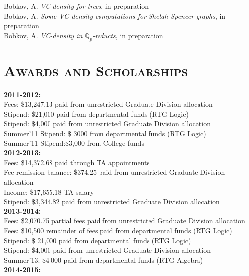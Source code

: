 \documentclass[margin, 10pt]{res} %
\begin{document}
\begin{resume}
Bobkov, A. {\it VC-density for trees}, in preparation  \\
Bobkov, A. {\it Some VC-density computations for Shelah-Spencer graphs}, in preparation \\
Bobkov, A. {\it VC-density in $\mathbb{Q}_p$-reducts}, in preparation

\section{\textsc{Awards and Scholarships}}

\textbf{2011-2012:} \\

Fees: \$13,247.13 paid from unrestricted Graduate Division allocation \\
Stipend: \$21,000 paid from departmental funds (RTG Logic) \\
Stipend: \$4,000 paid from unrestricted Graduate Division allocation \\
Summer'11 Stipend: \$ 3000 from departmental funds (RTG Logic) \\
Summer'11 Stipend:\$3,000 from College funds \\

\textbf{2012-2013:} \\

Fees: \$14,372.68 paid through TA appointments \\
Fee remission balance: \$374.25 paid from unrestricted Graduate Division allocation  \\
Income: \$17,655.18 TA salary \\
Stipend: \$3,344.82 paid from unrestricted Graduate Division allocation \\				
  
\textbf{2013-2014:} \\

Fees: \$2,070.75 partial fees paid from unrestricted Graduate Division allocation \\
Fees: \$10,500 remainder of fees paid from departmental funds (RTG Logic) \\
Stipend:  \$ 21,000 paid from departmental funds (RTG Logic) \\
Stipend: \$4,000 paid from unrestricted Graduate Division allocation \\
Summer'13: \$4,000 paid from departmental funds (RTG Algebra) \\

\textbf{2014-2015:} \\


\end{resume}
\end{document}
